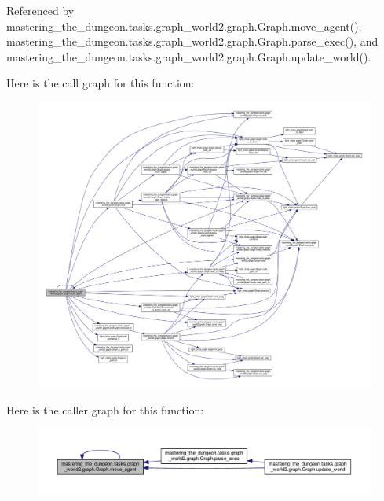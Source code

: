 Referenced by mastering\+\_\+the\+\_\+dungeon.\+tasks.\+graph\+\_\+world2.\+graph.\+Graph.\+move\+\_\+agent(), mastering\+\_\+the\+\_\+dungeon.\+tasks.\+graph\+\_\+world2.\+graph.\+Graph.\+parse\+\_\+exec(), and mastering\+\_\+the\+\_\+dungeon.\+tasks.\+graph\+\_\+world2.\+graph.\+Graph.\+update\+\_\+world().

Here is the call graph for this function\+:
\nopagebreak
\begin{figure}[H]
\begin{center}
\leavevmode
\includegraphics[width=350pt]{classmastering__the__dungeon_1_1tasks_1_1graph__world2_1_1graph_1_1Graph_a6a9b3f161580f744e976edd2e67f1b23_cgraph}
\end{center}
\end{figure}
Here is the caller graph for this function\+:
\nopagebreak
\begin{figure}[H]
\begin{center}
\leavevmode
\includegraphics[width=350pt]{classmastering__the__dungeon_1_1tasks_1_1graph__world2_1_1graph_1_1Graph_a6a9b3f161580f744e976edd2e67f1b23_icgraph}
\end{center}
\end{figure}
\mbox{\label{classmastering__the__dungeon_1_1tasks_1_1graph__world2_1_1graph_1_1Graph_abfb874a699ae22195f36b3af10ce5ceb}} 
